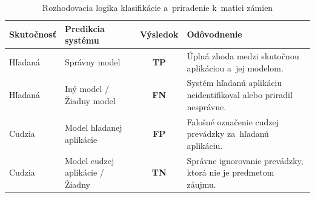\begin{table}[H]
\centering
\caption{Rozhodovacia logika klasifikácie a~priradenie k~matici zámien}
\label{tab:decision_logic}
\begin{tabularx}{\textwidth}{l l c X}
\toprule
\textbf{Skutočnosť} & \textbf{Predikcia systému} & \textbf{Výsledok} & \textbf{Odôvodnenie} \\ \midrule
Hľadaná & Správny model & \textbf{TP} & Úplná zhoda medzi skutočnou aplikáciou a~jej modelom. \\ \addlinespace
Hľadaná & Iný model / Žiadny model & \textbf{FN} & Systém hľadanú aplikáciu neidentifikoval alebo priradil nesprávne. \\ \addlinespace
Cudzia & Model hľadanej aplikácie & \textbf{FP} & Falošné označenie cudzej prevádzky za~hľadanú aplikáciu. \\
Cudzia & Model cudzej aplikácie / Žiadny & \textbf{TN} & Správne ignorovanie prevádzky, ktorá nie je predmetom záujmu. \\ \bottomrule
\end{tabularx}
\end{table}

